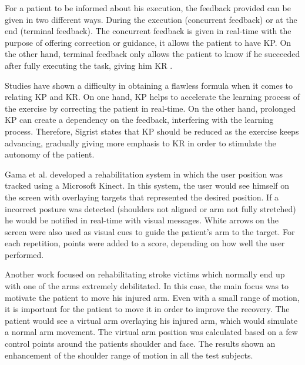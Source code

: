 For a patient to be informed about his execution, the feedback provided can be given in two different ways. During the execution
(concurrent feedback) or at the end (terminal feedback)\cite{Sigrist2013}.
The concurrent feedback is given in real-time with the purpose of offering correction or guidance, 
it allows the patient to have \ac{KP}. On the other hand, terminal feedback only allows the patient 
to know if he succeeded after fully executing the task, giving him \ac{KR} \cite{Design2005, Schonauer2011a}. 

Studies have shown a difficulty in obtaining a flawless formula when it comes to relating \ac{KP} and \ac{KR}. 
On one hand, \ac{KP} helps to accelerate the learning process of the exercise by correcting the patient in
real-time. On the other hand, prolonged \ac{KP} can create a dependency on the feedback, interfering with the 
learning process. Therefore, Sigrist \cite{Sigrist2013} states that \ac{KP} should be reduced as the exercise
keeps advancing, gradually giving more emphasis to \ac{KR} in order to stimulate the autonomy of the patient.

Gama et al. \cite{Gama2012a} developed a rehabilitation system in which the user position was tracked using a 
Microsoft Kinect. In this system, the user would see himself on the screen with overlaying targets that represented the desired position. 
If a incorrect posture was detected (shoulders not aligned or arm not fully stretched) he would be notified in real-time with visual messages. 
White arrows on the screen were also used as visual cues to guide the patient's arm to the target.
For each repetition, points were added to a score, depending on how well the user performed.

Another work \cite{Klein2013} focused on rehabilitating stroke victims which normally end up with one of the arms extremely debilitated.
In this case, the main focus was to motivate the patient to move his injured arm. Even with a small range of motion, it is 
important for the patient to move it in order to improve the recovery. The patient would see a virtual arm overlaying his injured arm, which would simulate a normal arm movement. 
The virtual arm position was calculated based on a few control points around the patients shoulder and face. 
The results shown an enhancement of the shoulder range of motion in all the test subjects.

